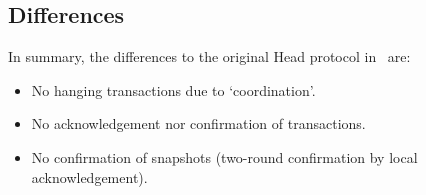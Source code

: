 \subsection{Differences}

In summary, the differences to the original Head protocol in~\cite{hydrahead20} are:

\begin{itemize}
  \item No hanging transactions due to `coordination'.
  \item No acknowledgement nor confirmation of transactions.
  \item No confirmation of snapshots (two-round confirmation by local acknowledgement).
\end{itemize}


